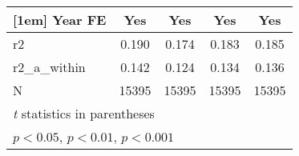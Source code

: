 {\begin{tabular}{l*{4}{c}}
[1em]
Year FE     &         Yes         &         Yes         &         Yes         &         Yes         \\
\hline
r2          &       0.190         &       0.174         &       0.183         &       0.185         \\
r2\_a\_within &       0.142         &       0.124         &       0.134         &       0.136         \\
N           &       15395         &       15395         &       15395         &       15395         \\
\hline\hline
\multicolumn{5}{l}{\footnotesize \textit{t} statistics in parentheses}\\
\multicolumn{5}{l}{\footnotesize \sym{*} \(p<0.05\), \sym{**} \(p<0.01\), \sym{***} \(p<0.001\)}\\
\end{tabular}
}
